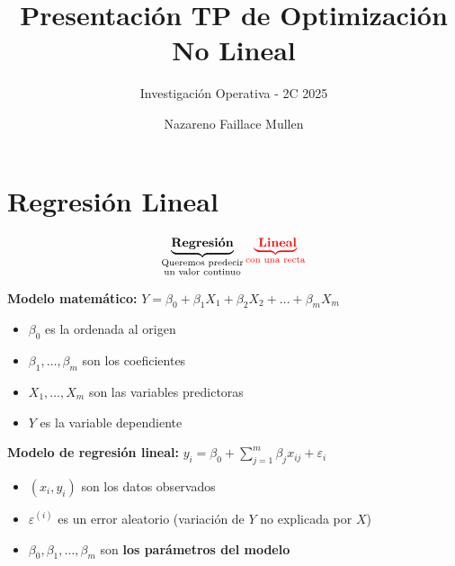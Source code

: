 \documentclass[10pt, aspectratio=169]{beamer}
\title{Presentación TP de Optimización No Lineal}
\subtitle{Investigación Operativa - 2C 2025}
\author{Nazareno Faillace Mullen}
\date{}
\newcommand{\super}[1]{^{(#1)}}
\begin{document}
    \frame[c]{\maketitle}





    \section{Regresión Lineal}

    \begin{frame}
        \huge
        \[\underbrace{\text{\textbf{Regresión}}}_{\substack{\text{Queremos predecir} \\ \text{un valor continuo}}}
            {\color{red}\underbrace{\text{ \textbf{Lineal}}}_{\text{con una recta}}}\]
    \end{frame}

    \begin{frame}
        \textbf{Modelo matemático:} $Y = \beta_0 + \beta_1 X_1 + \beta_{2}X_2 + \dots + \beta_{m}X_m$
        \begin{itemize}
            \item $\beta_0$ es la ordenada al origen
            \item $\beta_1,\dots, \beta_m$ son los coeficientes
            \item $X_1,\dots, X_m$ son las variables predictoras
            \item $Y$ es la variable dependiente
        \end{itemize}
        \textbf{Modelo de regresión lineal:} $y_i = \beta_0 + \sum_{j=1}^m \beta_j x_{ij} + \varepsilon_i$
        \begin{itemize}
            \item $(x_i, y_i)$ son los datos observados
            \item $\varepsilon\super{i}$ es un error aleatorio (variación de $Y$ no explicada por $X$)
            \item $\beta_0, \beta_1, \dots, \beta_m$ son \textbf{los parámetros del modelo}
        \end{itemize}
    \end{frame}
\end{document}
